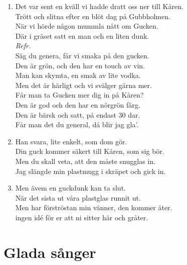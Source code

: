 \documentclass[twoside, openright]{report}
\begin{document}
\begin{enumerate}
\item Det var sent en kväll vi hadde dratt oss ner till Kåren.\\
Trött och slitna efter en blöt dag på Gubbholmen.\\
När vi hörde någon mummla nått om Gucken.\\
Där i gräset satt en man och en liten dunk.\\

\textit{Refr.}\\
Säg du genera, får vi smaka på den gucken.\\
Den är grön, och den har en touch av vin.\\
Man kan skymta, en smak av lite vodka.\\
Men det är härligt och vi svälger gärna mer.\\
Får man ta Gucken mer dig in på Kåren?\\
Den är god och den har en nörgrön färg.\\
Den är bärsk och satt, på endast 30 dar.\\
Får man det du general, då blir jag gla'.\\

\item Han svara, lite enkelt, som dom gör.\\
Din guck kommer säkert till Kåren, som sig bör.\\
Men du skall veta, att den måste snugglas in.\\
Jag slängde min plastmugg i skräpet och gick in.\\

\item Men ävem en guckdunk kan ta slut.\\
När det sista ut våra plastglas runnit ut.\\
Men har förströstan min vänner, den kommer åter.\\
ingen idé för er att ni sitter här och gråter.

\end{enumerate}


\chapter{Glada sånger}
\end{document}
